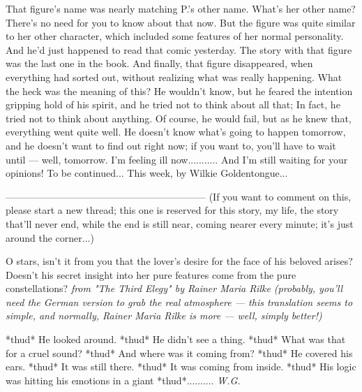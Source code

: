 That figure's name was nearly matching P.'s other name. 
What's her other name? There's no need for you to know about that now. 
But the figure was quite similar to her other character, which included some features of her normal personality. 
And he'd just happened to read that comic yesterday. 
The story with that figure was the last one in the book. 
And finally, that figure disappeared, when everything had sorted out, without realizing what was really happening. 
What the heck was the meaning of this?
He wouldn't know, but he feared the intention gripping hold of his spirit, and he tried not to think about all that; In fact, he tried not to think about anything. 
Of course, he would fail, but as he knew that, everything went quite well. 
He doesn't know what's going to happen tomorrow, and he doesn't want to find out right now; if you want to, you'll have to wait until --- well, tomorrow. 
I'm feeling ill now...........
And I'm still waiting for your opinions!
To be continued...
This week, by Wilkie Goldentongue...

--------------------------------------------------------------
(If you want to comment on this, please start a new thread; this one is reserved for this story, my life, the story that'll never end, while the end is still near, coming nearer every minute; it's just around the corner...)

O stars,
isn't it from you that the lover's desire for the face of his beloved arises? Doesn't 
his secret insight into her pure features come from the pure constellations?
\emph{from "The Third Elegy" by Rainer Maria Rilke (probably, you'll need the German version to grab the real atmosphere --- this translation seems to simple, and normally, Rainer Maria Rilke is more --- well, simply better!)}

*thud*
He looked around. 
*thud*
He didn't see a thing. 
*thud*
What was that for a cruel sound?
*thud*
And where was it coming from?
*thud*
He covered his ears. 
*thud*
It was still there. 
*thud*
It was coming from inside. 
*thud*
His logic was hitting his emotions in a giant 
*thud*..........
\emph{W.G.}
